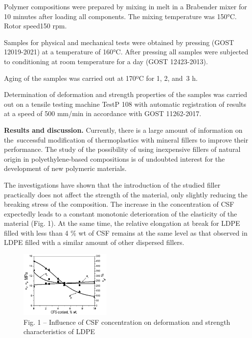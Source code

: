 \begin{multicols}{2}
Polymer compositions were prepared by mixing in melt in a Brabender
mixer for 10 minutes after loading all components. The mixing
temperature was 150°C. Rotor speed150 rpm.

Samples for physical and mechanical tests were obtained by pressing
(GOST 12019-2021) at a temperature of 160°C. After pressing all samples
were subjected to conditioning at room temperature for a day (GOST
12423-2013).

Aging of the samples was carried out at 170ºC for 1, 2, and~3 h.

Determination of deformation and strength properties of the samples was
carried out on a tensile testing machine TestP 108 with automatic
registration of results at a speed of 500 mm/min in accordance with GOST
11262-2017.

{\bfseries Results and discussion.} Currently, there is a large amount of
information on the~successful modification of thermoplastics with
mineral fillers to improve their performance. The study of the
possibility of using inexpensive fillers of natural origin in
polyethylene-based compositions is of undoubted interest for the
development of new polymeric materials.

The investigations have shown that the introduction of the studied
filler practically does not affect the strength of the material, only
slightly reducing the breaking stress of the composition. The increase
in the concentration of CSF expectedly leads to a constant monotonic
deterioration of the elasticity of the material (Fig. 1). At the same
time, the relative elongation at break for LDPE filled with less than 4
\% wt of CSF remains at the same level as that observed in LDPE filled
with a similar amount of other dispersed fillers.
\end{multicols}

\begin{figure}[H]
	\centering
	\includegraphics[width=0.4\textwidth]{media/chem/image19}
	\caption*{Fig. 1 -- Influence of CSF concentration on deformation and
strength characteristics of LDPE}
\end{figure}

